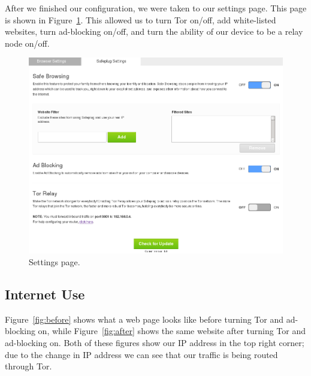 \documentclass[conference]{IEEEtran}
\begin{document}
After we finished our configuration, we were taken to our settings page.  This page is shown in Figure~\ref{fig:settings}.  This allowed us to turn Tor on/off, add white-listed websites, turn ad-blocking on/off, and turn the ability of our device to be a relay node on/off.  

\begin{figure}[htb]
\begin{center}
\includegraphics[width=.75\textwidth]{settings}
\caption{Settings page.}
\label{fig:settings}
\end{center}
\end{figure}

\subsection{Internet Use}
\label{inetuse}
Figure~\ref{fig:before} shows what a web page looks like before turning Tor and ad-blocking on, while Figure~\ref{fig:after} shows the same website after turning Tor and ad-blocking on.  Both of these figures show our IP address in the top right corner; due to the change in IP address we can see that our traffic is being routed through Tor.  

\end{document}
